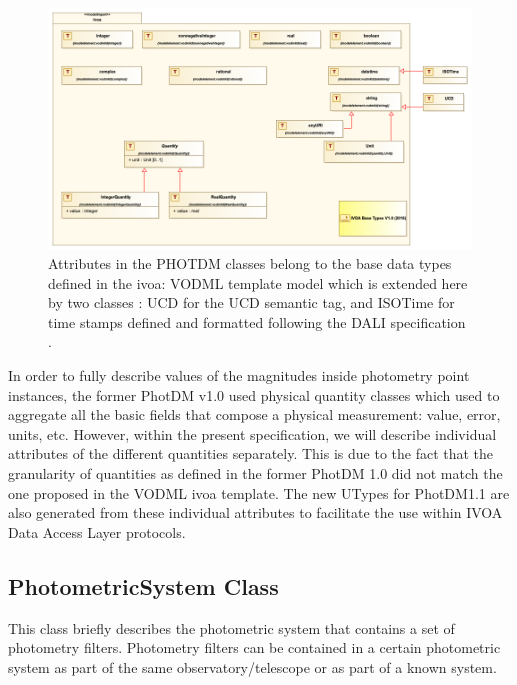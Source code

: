 \documentclass[11pt,a4paper]{ivoa}
\begin{document}
\begin{figure}[H]
\includegraphics[angle=0,width=5.98in ]{./schema/BaseDataTypesdiagram.png}
\caption{Attributes in the PHOTDM classes belong to the base data types defined in the ivoa: VODML template model which is extended here by two classes : UCD for the UCD semantic tag, and ISOTime for time stamps defined and formatted following the DALI specification \citep{2017ivoa.spec.0517D} .}
\end{figure}





\newpage


\newpage
In order to fully describe values of the magnitudes inside photometry point
instances, the former PhotDM v1.0 used  physical quantity classes which used to
aggregate all the basic fields that compose a physical measurement: value,
error, units, etc. However, within the present specification, we will describe
individual attributes of the different quantities separately.
This is due to the fact that the granularity of quantities as defined in the former PhotDM 1.0
did not match the one proposed in the VODML ivoa template. The new UTypes for PhotDM1.1 are also
generated from these individual attributes to facilitate the use within IVOA Data Access Layer protocols.

\par

\subsection{PhotometricSystem Class}
This class briefly describes the photometric system that contains a set of
photometry filters. Photometry filters can be contained in a certain
photometric system as part of the same observatory/telescope or as part
of a known system.
\par
\end{document}
